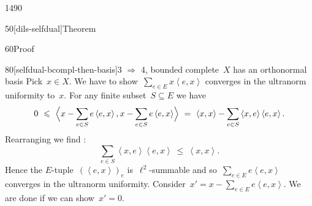 \begin{parsec}{1490}
\begin{point}{50}[dils-selfdual]{Theorem}
\begin{point}{60}{Proof}
\begin{point}{80}[selfdual-bcompl-then-basis]{3
    $\Rightarrow$ 4, bounded complete~$X$ has an orthonormal basis}
Pick~$x \in X$.
We have to show~$\sum_{e \in E} x\left<e,x\right>$
converges in the ultranorm uniformity to~$x$.
For any finite subset~$S \subseteq E$ we have
\begin{equation*}
    0\  \leq\  \Bigl< x - \sum_{e \in S} e\left<e,x\right>,
        x - \sum_{e \in S} e\left<e,x\right> \Bigr>
       \  =\  \left<x,x\right> - \sum_{e \in S} \left<x,e\right>\left<e,x\right>.
\end{equation*}
Rearranging we find :
\begin{equation*}
\sum_{e \in S} \left<x,e\right>\left<e,x\right>
   \  \leq \ \left<x,x\right>.
\end{equation*}
Hence the $E$-tuple~$(\left<e,x\right>)_e$
is~$\ell^2$-summable
and so~$\sum_{e \in E} e \left<e,x\right>$
converges in the ultranorm uniformity.
Consider~$x' = x - \sum_{e \in E} e\left<e,x\right>$.
We are done if we can show~$x' = 0$.


\end{point}
\end{point}
\end{point}
\end{parsec}
